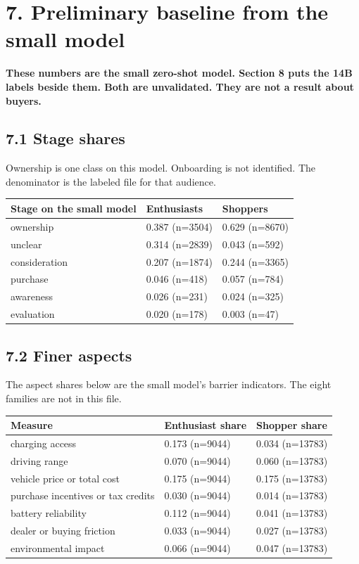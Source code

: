 \documentclass[11pt]{article}
\begin{document}
\section{7. Preliminary baseline from the small model}

\textbf{These numbers are the small zero-shot model. Section 8 puts the 14B labels beside them. Both are unvalidated. They are not a result about buyers.}


\subsection{7.1 Stage shares}

Ownership is one class on this model. Onboarding is not identified. The denominator is the labeled file for that audience.


\begin{longtable}{lll}
\toprule
Stage on the small model & Enthusiasts & Shoppers \\
\midrule
ownership & 0.387 (n=3504) & 0.629 (n=8670) \\
unclear & 0.314 (n=2839) & 0.043 (n=592) \\
consideration & 0.207 (n=1874) & 0.244 (n=3365) \\
purchase & 0.046 (n=418) & 0.057 (n=784) \\
awareness & 0.026 (n=231) & 0.024 (n=325) \\
evaluation & 0.020 (n=178) & 0.003 (n=47) \\
\bottomrule
\end{longtable}


\subsection{7.2 Finer aspects}

The aspect shares below are the small model's barrier indicators. The eight families are not in this file.


\begin{longtable}{lll}
\toprule
Measure & Enthusiast share & Shopper share \\
\midrule
charging access & 0.173 (n=9044) & 0.034 (n=13783) \\
driving range & 0.070 (n=9044) & 0.060 (n=13783) \\
vehicle price or total cost & 0.175 (n=9044) & 0.175 (n=13783) \\
purchase incentives or tax credits & 0.030 (n=9044) & 0.014 (n=13783) \\
battery reliability & 0.112 (n=9044) & 0.041 (n=13783) \\
dealer or buying friction & 0.033 (n=9044) & 0.027 (n=13783) \\
environmental impact & 0.066 (n=9044) & 0.047 (n=13783) \\
\bottomrule
\end{longtable}
\end{document}
